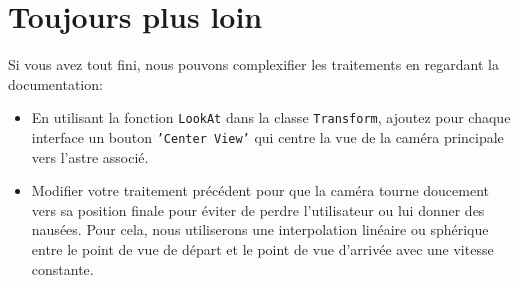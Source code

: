 \documentclass[a4paper,10pt]{article}
\begin{document}
\newpage 

\section{Toujours plus loin}

Si vous avez tout fini, nous pouvons complexifier les traitements en regardant la documentation:
\begin{itemize}
	\item En utilisant la fonction \texttt{LookAt} dans la classe \texttt{Transform}, ajoutez pour chaque interface un bouton \texttt{'Center View'} qui centre la vue de la caméra principale vers l'astre associé.
	\item Modifier votre traitement précédent pour que la caméra tourne doucement vers sa position finale pour éviter de perdre l'utilisateur ou lui donner des nausées. Pour cela, nous utiliserons une interpolation linéaire ou sphérique  entre le point de vue de départ et le point de vue d'arrivée avec une vitesse constante.
\end{itemize}
\end{document}
